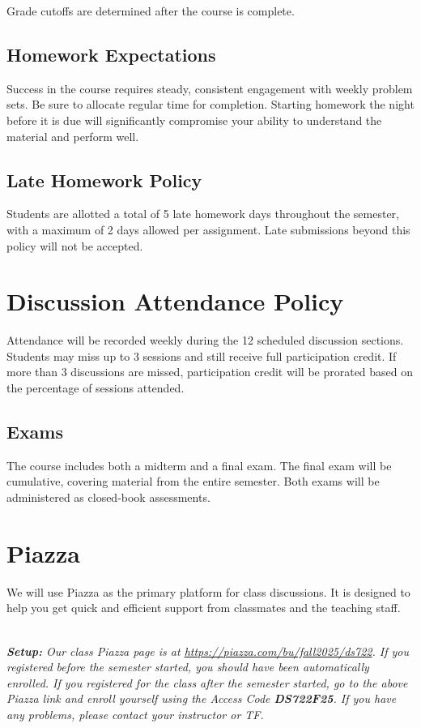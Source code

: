 \documentclass[11pt]{article}
\begin{document}
Grade cutoffs are determined after the course is complete.

\subsection*{Homework Expectations}

Success in the course requires steady, consistent engagement with weekly problem sets. Be sure to allocate regular time for completion. Starting homework the night before it is due will significantly compromise your ability to understand the material and perform well.

\subsection*{Late Homework Policy}

Students are allotted a total of 5 late homework days throughout the semester, with a maximum of 2 days allowed per assignment. Late submissions beyond this policy will not be accepted.

\section*{Discussion Attendance Policy}

Attendance will be recorded weekly during the 12 scheduled discussion sections. Students may miss up to 3 sessions and still receive full participation credit. If more than 3 discussions are missed, participation credit will be prorated based on the percentage of sessions attended.

\subsection*{Exams}

The course includes both a midterm and a final exam. The final exam will be cumulative, covering material from the entire semester. Both exams will be administered as closed-book assessments.

\section*{Piazza}

We will use Piazza as the primary platform for class discussions. It is designed to help you get quick and efficient support from classmates and the teaching staff.

~\\\emph{\textbf{Setup:} Our class Piazza
page is at \url{https://piazza.com/bu/fall2025/ds722}.  If you
registered before the semester started, you should have been automatically enrolled. If you registered for the class after the semester started, go to the above Piazza link and enroll yourself using the Access Code {\bf DS722F25}. If you have any problems, please contact your instructor or TF.}
\end{document}

